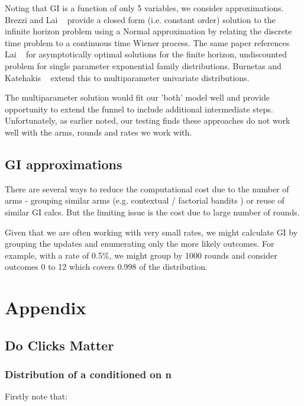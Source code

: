 \documentclass[12pt]{article}
\begin{document}
Noting that GI is a function of only 5 variables, we consider approximations. Brezzi and Lai ~\cite{brezzi2002optimal} provide a closed form (i.e. constant order) solution to the infinite horizon problem using a Normal approximation by relating the discrete time problem to a continuous time Wiener process.  The same paper references Lai ~\cite{lai1987adaptive} for asymptotically optimal solutions for the finite horizon, undiscounted problem for single parameter exponential family distributions. Burnetas and Katehakis ~\cite{burnetas1996optimal} extend this to multiparameter univariate distributions.

The multiparameter solution would fit our 'both' model well and provide opportunity to extend the funnel to include additional intermediate steps. Unfortunately, as earlier noted, our testing finds these approaches do not work well with the arms, rounds and rates we work with.

\subsection{GI approximations}

There are several ways to reduce the computational cost due to the number of arms - grouping similar arms (e.g. contextual / factorial bandits ) or reuse of similar GI calcs. But the limiting issue is the cost due to large number of rounds.

Given that we are often working with very small rates, we might calculate GI by grouping the updates and enumerating only the more likely outcomes. For example, with a rate of 0.5\%, we might group by 1000 rounds and consider outcomes 0 to 12 which covers 0.998 of the distribution. 

\pagebreak

\section{Appendix}

\subsection{Do Clicks Matter}

\subsubsection{Distribution of a conditioned on n}

Firstly note that:
\end{document}
